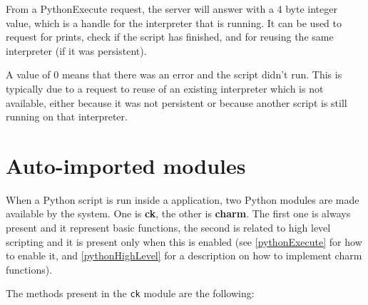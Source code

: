 From a PythonExecute request, the server will answer with a 4 byte integer
value, which is a handle for the interpreter that is running. It can be used to
request for prints, check if the script has finished, and for reusing the same
interpreter (if it was persistent).

A value of 0 means that there was an error and the script didn't run. This is
typically due to a request to reuse of an existing interpreter which is not
available, either because it was not persistent or because another script is
still running on that interpreter.


\section{Auto-imported modules}
\label{pythonModules}

When a Python script is run inside a \charmpp{} application, two Python modules
are made available by the system. One is \textbf{ck}, the other is
\textbf{charm}. The first one is always present and it represent basic
functions, the second is related to high level scripting and it is present only
when this is enabled (see \ref{pythonExecute} for how to enable it, and
\ref{pythonHighLevel} for a description on how to implement charm functions).

The methods present in the \texttt{ck} module are the following:

